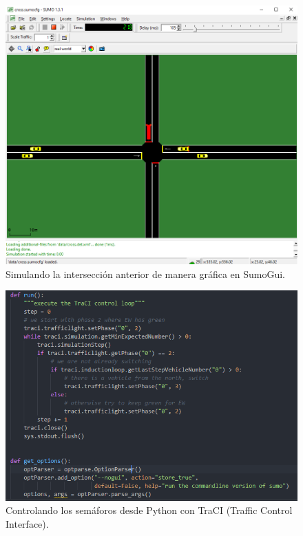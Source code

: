 \begin{figure}[H]
    \centering
\includegraphics[width=\textwidth]{sumo/f06ad63e2235a639007f9748f2326f91.png}
    \caption{Simulando la intersección anterior de manera gráfica en SumoGui.}
    \label{fig:sumogui1}
\end{figure}

\begin{figure}[H]
    \centering
\includegraphics[width=\textwidth]{sumo/8a185a540ef5e98b250d7c70216cddfc.png}
    \caption{Controlando los semáforos desde Python con TraCI (Traffic Control Interface).}
    \label{fig:traci1}
\end{figure}

